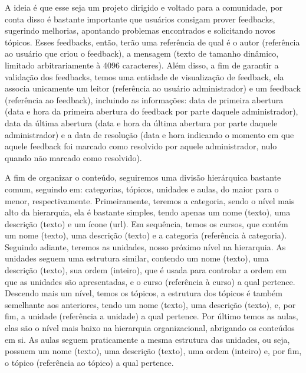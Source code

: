 A ideia é que esse seja um projeto dirigido e voltado para a comunidade, por
conta disso é bastante importante que usuários consigam prover feedbacks,
sugerindo melhorias, apontando problemas encontrados e solicitando novos
tópicos. Esses feedbacks, então, terão uma referência de qual é o autor
(referência ao usuário que criou o feedback), a mensagem (texto de tamanho
dinâmico, limitado arbitrariamente à 4096 caracteres). Além disso, a fim de
garantir a validação dos feedbacks, temos uma entidade de visualização de
feedback, ela associa unicamente um leitor (referência ao usuário
administrador) e um feedback (referência ao feedback), incluindo as
informações: data de primeira abertura (data e hora da primeira abertura do
feedback por parte daquele administrador), data da última abertura (data e hora
da última abertura por parte daquele administrador) e a data de resolução (data
e hora indicando o momento em que aquele feedback foi marcado como resolvido
por aquele administrador, nulo quando não marcado como resolvido).

A fim de organizar o conteúdo, seguiremos uma divisão hierárquica bastante
comum, seguindo em: categorias, tópicos, unidades e aulas, do maior para o
menor, respectivamente. Primeiramente, teremos a categoria, sendo o nível mais
alto da hierarquia, ela é bastante simples, tendo apenas um nome (texto), uma
descrição (texto) e um ícone (url). Em sequência, temos os cursos, que contém
um nome (texto), uma descrição (texto) e a categoria (referência à categoria).
Seguindo adiante, teremos as unidades, nosso próximo nível na hierarquia. As
unidades seguem uma estrutura similar, contendo um nome (texto), uma descrição
(texto), sua ordem (inteiro), que é usada para controlar a ordem em que as
unidades são apresentadas, e o curso (referência à curso) a qual pertence.
Descendo mais um nível, temos os tópicos, a estrutura dos tópicos é também
semelhante aos anteriores, tendo um nome (texto), uma descrição (texto), e, por
fim, a unidade (referência a unidade) a qual pertence. Por último temos as
aulas, elas são o nível mais baixo na hierarquia organizacional, abrigando os
conteúdos em si. As aulas seguem praticamente a mesma estrutura das unidades,
ou seja, possuem um nome (texto), uma descrição (texto), uma ordem (inteiro) e,
por fim, o tópico (referência ao tópico) a qual pertence.

